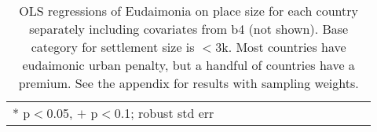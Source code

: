 \documentclass[10pt, letterpaper]{article}
\begin{document}
\begin{spacing}{1.4}
\begin{spacing}{.9} \begin{table}[H]\centering   \begin{scriptsize} \begin{tabular}{p{.5in}p{.5in}p{.5in}p{.5in}p{.5in}p{.5in}p{.5in}p{.5in}p{.5in}p{.5in}p{.5
                                                                      in}p{.5in}p{.5
                                                                      in}}\hline
                                                                      
                                                                      \hline *
                                                                      p$<$0.05,
                                                                      $+$
                                                                      p$<$0.1;
                                                                      robust std
                                                                      err \end{tabular}\end{scriptsize}\caption{\label{b4cou}OLS
                                                                    regressions
                                                                    of Eudaimonia on
                                                                    place size
                                                                    for each
                                                                    country
                                                                    separately
                                                                    including
                                                                    covariates
                                                                    from b4 (not
                                                                    shown). Base category for settlement size is $<$3k.  Most
                                                                    countries
                                                                    have 
                                                                    eudaimonic
                                                                    urban
                                                                    penalty, but
                                                                    a
                                                                    handful of
                                                                    countries
                                                                    have a 
                                                                    premium. See
                                                                    the appendix
                                                                    for results with sampling weights.%
                                                           }\end{table} \end{spacing}






\end{spacing}
\end{document}
